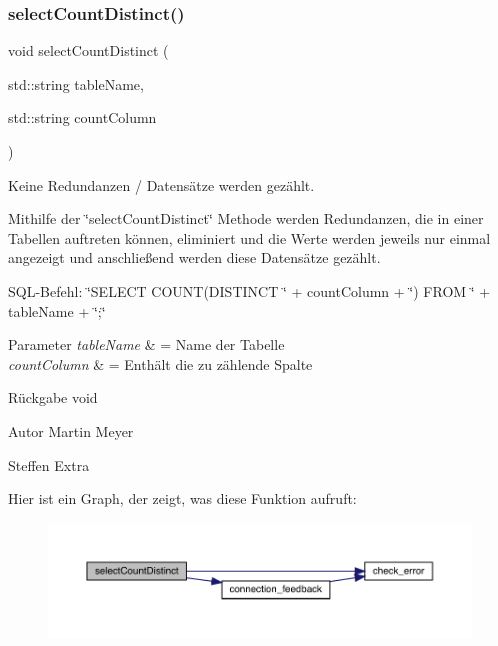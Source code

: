 \subsubsection{select\+Count\+Distinct()}
{\footnotesize\ttfamily void select\+Count\+Distinct (\begin{DoxyParamCaption}\item[{std\+::string}]{table\+Name,  }\item[{std\+::string}]{count\+Column }\end{DoxyParamCaption})}



Keine Redundanzen / Datensätze werden gezählt. 

Mithilfe der \char`\"{}select\+Count\+Distinct\char`\"{} Methode werden Redundanzen, die in einer Tabellen auftreten können, eliminiert und die Werte werden jeweils nur einmal angezeigt und anschließend werden diese Datensätze gezählt.~\newline


S\+Q\+L-\/\+Befehl\+: \char`\"{}\+S\+E\+L\+E\+C\+T C\+O\+U\+N\+T(\+D\+I\+S\+T\+I\+N\+C\+T \char`\"{} + count\+Column + \char`\"{}) F\+R\+O\+M \char`\"{} + table\+Name + \char`\"{};\char`\"{}


\begin{DoxyParams}{Parameter}
{\em table\+Name} & = Name der Tabelle \\
\hline
{\em count\+Column} & = Enthält die zu zählende Spalte\\
\hline
\end{DoxyParams}
\begin{DoxyReturn}{Rückgabe}
void
\end{DoxyReturn}
\begin{DoxyAuthor}{Autor}
Martin Meyer 

Steffen Extra 
\end{DoxyAuthor}
Hier ist ein Graph, der zeigt, was diese Funktion aufruft\+:\nopagebreak
\begin{figure}[H]
\begin{center}
\leavevmode
\includegraphics[width=350pt]{selection_request_8cpp_a8d6f770e3b1eb29fce843172c187ccc6_cgraph}
\end{center}
\end{figure}
\mbox{\label{selection_request_8cpp_a851bc3e6b04b4dfaa359b43534a37cd5}} 
